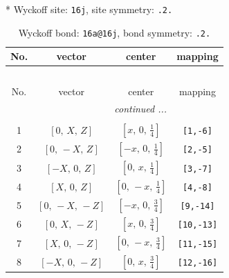 \documentclass[fleqn,8pt]{jsarticle}
\begin{document}
* Wyckoff site: {\tt 16j}, site symmetry: {\tt .2.}
\renewcommand{\arraystretch}{1.2}
\begin{longtable}{cccc}
\caption{Wyckoff bond: {\tt 16a@16j}, bond symmetry: {\tt .2.}}
 \\
 \hline \hline
No. & vector & center & mapping \\ \hline \endfirsthead

\multicolumn{3}{l}{\tablename\ \thetable{}} \\
 \hline \hline
No. & vector & center & mapping \\ \hline \endhead

 \hline \hline
\multicolumn{3}{r}{\footnotesize\it continued ...} \\ \endfoot

 \hline \hline
\multicolumn{3}{r}{} \\ \endlastfoot

1 & $\left[ 0,\, X,\, Z \right]$ & $\left[ x,\, 0,\, \frac{1}{4} \right]$ & {\tt [1,-6]} \\ \hline
2 & $\left[ 0,\, - X,\, Z \right]$ & $\left[ - x,\, 0,\, \frac{1}{4} \right]$ & {\tt [2,-5]} \\ \hline
3 & $\left[ - X,\, 0,\, Z \right]$ & $\left[ 0,\, x,\, \frac{1}{4} \right]$ & {\tt [3,-7]} \\ \hline
4 & $\left[ X,\, 0,\, Z \right]$ & $\left[ 0,\, - x,\, \frac{1}{4} \right]$ & {\tt [4,-8]} \\ \hline
5 & $\left[ 0,\, - X,\, - Z \right]$ & $\left[ - x,\, 0,\, \frac{3}{4} \right]$ & {\tt [9,-14]} \\ \hline
6 & $\left[ 0,\, X,\, - Z \right]$ & $\left[ x,\, 0,\, \frac{3}{4} \right]$ & {\tt [10,-13]} \\ \hline
7 & $\left[ X,\, 0,\, - Z \right]$ & $\left[ 0,\, - x,\, \frac{3}{4} \right]$ & {\tt [11,-15]} \\ \hline
8 & $\left[ - X,\, 0,\, - Z \right]$ & $\left[ 0,\, x,\, \frac{3}{4} \right]$ & {\tt [12,-16]} \\
\end{longtable}
\renewcommand{\arraystretch}{1.2}
\end{document}
